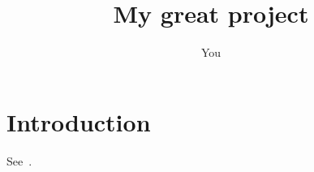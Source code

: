 \documentclass[11pt,a4paper]{article}
\title{My great project}
\author{You}
\begin{document}
\maketitle

\section{Introduction}
See~\cite{Pedregosa2011Scikit, Rahimi2008Random}.



\end{document}
